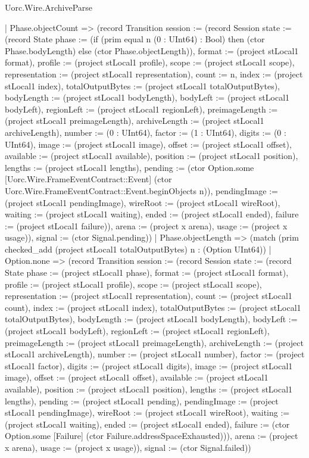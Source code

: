 \begin{lexlean}{Uorc.Wire.ArchiveParse}
\begin{semanticmodule}
{    | Phase.objectCount => (record Transition {session := (record Session {state := (record State {phase := (if (prim equal n (0 : UInt64) : Bool) then (ctor Phase.bodyLength) else (ctor Phase.objectLength)), format := (project stLocal1 format), profile := (project stLocal1 profile), scope := (project stLocal1 scope), representation := (project stLocal1 representation), count := n, index := (project stLocal1 index), totalOutputBytes := (project stLocal1 totalOutputBytes), bodyLength := (project stLocal1 bodyLength), bodyLeft := (project stLocal1 bodyLeft), regionLeft := (project stLocal1 regionLeft), preimageLength := (project stLocal1 preimageLength), archiveLength := (project stLocal1 archiveLength), number := (0 : UInt64), factor := (1 : UInt64), digits := (0 : UInt64), image := (project stLocal1 image), offset := (project stLocal1 offset), available := (project stLocal1 available), position := (project stLocal1 position), lengths := (project stLocal1 lengths), pending := (ctor Option.some [Uorc.Wire.FrameEventContract::Event] (ctor Uorc.Wire.FrameEventContract::Event.beginObjects n)), pendingImage := (project stLocal1 pendingImage), wireRoot := (project stLocal1 wireRoot), waiting := (project stLocal1 waiting), ended := (project stLocal1 ended), failure := (project stLocal1 failure)}), arena := (project x arena), usage := (project x usage)}), signal := (ctor Signal.pending)})
    | Phase.objectLength => (match (prim checked_add (project stLocal1 totalOutputBytes) n : (Option UInt64))
      | Option.none => (record Transition {session := (record Session {state := (record State {phase := (project stLocal1 phase), format := (project stLocal1 format), profile := (project stLocal1 profile), scope := (project stLocal1 scope), representation := (project stLocal1 representation), count := (project stLocal1 count), index := (project stLocal1 index), totalOutputBytes := (project stLocal1 totalOutputBytes), bodyLength := (project stLocal1 bodyLength), bodyLeft := (project stLocal1 bodyLeft), regionLeft := (project stLocal1 regionLeft), preimageLength := (project stLocal1 preimageLength), archiveLength := (project stLocal1 archiveLength), number := (project stLocal1 number), factor := (project stLocal1 factor), digits := (project stLocal1 digits), image := (project stLocal1 image), offset := (project stLocal1 offset), available := (project stLocal1 available), position := (project stLocal1 position), lengths := (project stLocal1 lengths), pending := (project stLocal1 pending), pendingImage := (project stLocal1 pendingImage), wireRoot := (project stLocal1 wireRoot), waiting := (project stLocal1 waiting), ended := (project stLocal1 ended), failure := (ctor Option.some [Failure] (ctor Failure.addressSpaceExhausted))}), arena := (project x arena), usage := (project x usage)}), signal := (ctor Signal.failed)})
}
\end{semanticmodule}
\end{lexlean}
